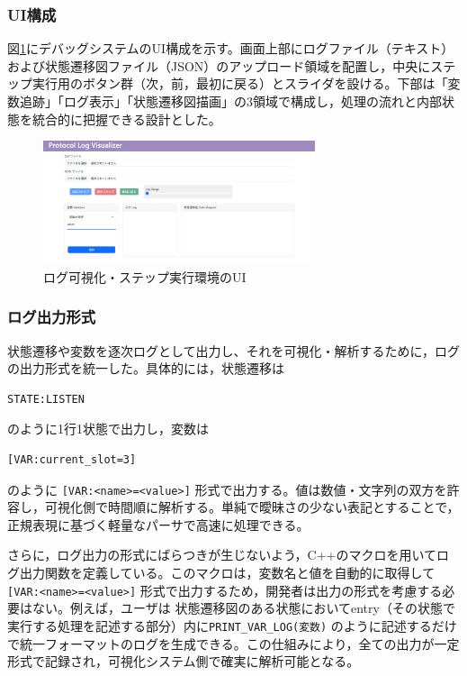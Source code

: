 \documentclass[technicalreport]{ieicej}
\begin{document}
\subsubsection{UI構成}
図\ref{fig:viewer-ui}にデバッグシステムのUI構成を示す。画面上部にログファイル（テキスト）および状態遷移図ファイル（JSON）のアップロード領域を配置し，中央にステップ実行用のボタン群（次，前，最初に戻る）とスライダを設ける。下部は「変数追跡」「ログ表示」「状態遷移図描画」の3領域で構成し，処理の流れと内部状態を統合的に把握できる設計とした。
\begin{figure}[b]
  \centering
  \includegraphics[width=80mm]{./images/viewer_ui.png}
  \caption{ログ可視化・ステップ実行環境のUI}
  \label{fig:viewer-ui}
\end{figure}

\subsubsection{ログ出力形式}
状態遷移や変数を逐次ログとして出力し、それを可視化・解析するために，ログの出力形式を統一した。具体的には，状態遷移は
\begin{verbatim}
STATE:LISTEN
\end{verbatim}
のように1行1状態で出力し，変数は
\begin{verbatim}
[VAR:current_slot=3]
\end{verbatim}
のように \verb|[VAR:<name>=<value>]| 形式で出力する。値は数値・文字列の双方を許容し，可視化側で時間順に解析する。単純で曖昧さの少ない表記とすることで，正規表現に基づく軽量なパーサで高速に処理できる。

さらに，ログ出力の形式にばらつきが生じないよう，C++のマクロを用いてログ出力関数を定義している。このマクロは，変数名と値を自動的に取得して \verb|[VAR:<name>=<value>]| 形式で出力するため，開発者は出力の形式を考慮する必要はない。例えば，ユーザは 状態遷移図のある状態においてentry（その状態で実行する処理を記述する部分）内に\verb|PRINT_VAR_LOG(変数)| のように記述するだけで統一フォーマットのログを生成できる。この仕組みにより，全ての出力が一定形式で記録され，可視化システム側で確実に解析可能となる。
\end{document}
